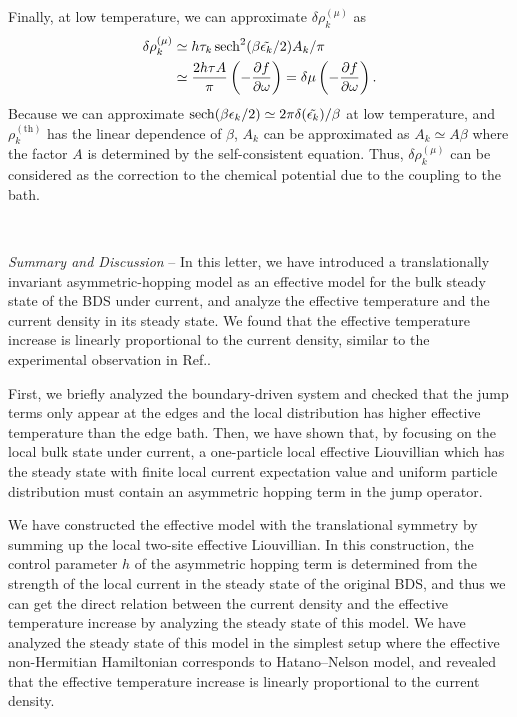 \documentclass[a4paper, amsfonts, amssymb, amsmath, reprint, showkeys, nofootinbib, twoside,superscriptaddress, prl]{revtex4-2}
\newcommand{\mr}[1]{\mathrm{#1}}
\newcommand{\epk}{\epsilon_k}
\newcommand{\p}{\partial}
\begin{document}
Finally, at low temperature, we can approximate $\delta\rho_k^{(\mu)}$ as 
\begin{align}
    \delta\rho_k^{(\mu)} &\simeq h\tau_k\sech^2(\beta\tilde{\epk}/2)A_k/\pi\\
    & \simeq \frac{2h\tau A}{\pi} \left(-\frac{\p f}{\p\omega}\right) = \delta\mu\left(-\frac{\p f}{\p\omega}\right).\label{eff_mu}
\end{align}
Because we can approximate $\sech(\beta\epk/2)\simeq 2\pi \delta(\tilde{\epk})/\beta$ at low temperature, and $\rho^{(\mr{th})}_k$ has the linear dependence of $\beta$, $A_k$ can be approximated as $A_k \simeq A\beta$ where the factor $A$ is determined by the self-consistent equation. Thus, $\delta\rho_k^{(\mu)}$ can be considered as the correction to the chemical potential due to the coupling to the bath.

\

{\it{Summary and Discussion}} --
In this letter, we have introduced a translationally invariant asymmetric-hopping model as an effective model for the bulk steady state of the BDS under current, and analyze the effective temperature and the current density in its steady state. We found that the effective temperature increase is linearly proportional to the current density, similar to the experimental observation in Ref.\cite{Ootsuki2025-em}. 

First, we briefly analyzed the boundary-driven system and checked that the jump terms only appear at the edges and the local distribution has higher effective temperature than the edge bath. Then, we have shown that, by focusing on the local bulk state under current, a one-particle local effective Liouvillian which has the steady state with finite local current expectation value and uniform particle distribution must contain an asymmetric hopping term in the jump operator. 

We have constructed the effective model with the translational symmetry by summing up the local two-site effective Liouvillian. In this construction, the control parameter $h$ of the asymmetric hopping term is determined from the strength of the local current in the steady state of the original BDS, and thus we can get the direct relation between the current density and the effective temperature increase by analyzing the steady state of this model.
We have analyzed the steady state of this model in the simplest setup where the effective non-Hermitian Hamiltonian corresponds to Hatano--Nelson model, and revealed that the effective temperature increase is linearly proportional to the current density. 
\end{document}
